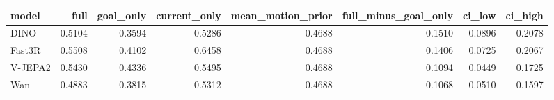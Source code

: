 \begin{tabular}{lrrrrrrr}
\toprule
model & full & goal\_only & current\_only & mean\_motion\_prior & full\_minus\_goal\_only & ci\_low & ci\_high \\
\midrule
DINO & 0.5104 & 0.3594 & 0.5286 & 0.4688 & 0.1510 & 0.0896 & 0.2078 \\
Fast3R & 0.5508 & 0.4102 & 0.6458 & 0.4688 & 0.1406 & 0.0725 & 0.2067 \\
V-JEPA2 & 0.5430 & 0.4336 & 0.5495 & 0.4688 & 0.1094 & 0.0449 & 0.1725 \\
Wan & 0.4883 & 0.3815 & 0.5312 & 0.4688 & 0.1068 & 0.0510 & 0.1597 \\
\bottomrule
\end{tabular}
